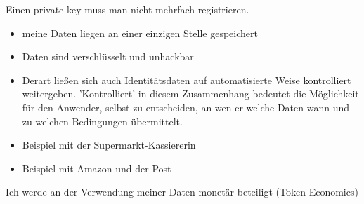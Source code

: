 \vspace{0.3cm}


\begin{Solution}[mangelhafte UX]

Einen private key muss man nicht mehrfach registrieren.

\end{Solution}

\vspace{0.3cm}


\begin{Solution}[Datenschutz]

\begin{itemize}
  \item meine Daten liegen an einer einzigen Stelle gespeichert
  \item Daten sind verschlüsselt und unhackbar
  \item Derart ließen sich auch Identitätsdaten auf automatisierte Weise kontrolliert weitergeben. 'Kontrolliert' in diesem Zusammenhang bedeutet die Möglichkeit für den Anwender, selbst zu entscheiden, an wen er welche Daten wann und zu welchen Bedingungen übermittelt.
\end{itemize}

\end{Solution}

\vspace{0.3cm}


\begin{Solution}

\begin{itemize}
  \item Beispiel mit der Supermarkt-Kassiererin
  \item Beispiel mit Amazon und der Post
\end{itemize}

\end{Solution}

\vspace{0.3cm}


\begin{Solution}

Ich werde an der Verwendung meiner Daten monetär beteiligt (Token-Economics)

\end{Solution}

\vspace{0.3cm}


